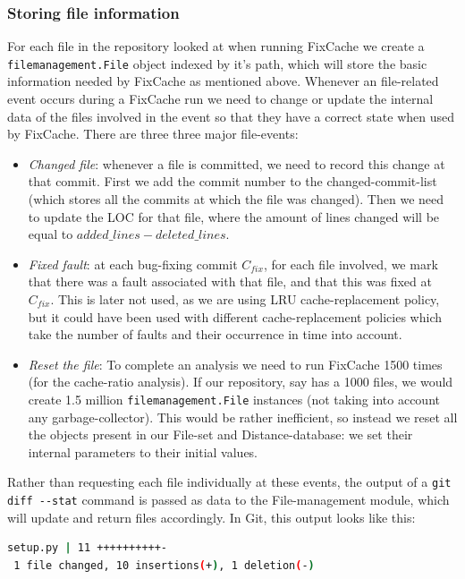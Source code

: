 \documentclass[12pt,twoside,notitlepage]{report}
\newcommand{\fxch}{FixCache}
\begin{document}
\subsubsection*{Storing file information}
For each file in the repository looked at when running \fxch{} we create a \texttt{filemanagement.File} object indexed by it's path, which will store the basic information needed by \fxch{} as mentioned above. Whenever an file-related event occurs during a \fxch{} run we need to change or update the internal data of the files involved in the event so that they have a correct state when used by \fxch{}. There are three three major file-events:
\begin{itemize}
\item \textit{Changed file}: whenever a file is committed, we need to record this change at that commit. First we add the commit number to the changed-commit-list (which stores all the commits at which the file was changed). Then we need to update the LOC for that file, where the amount of lines changed will be equal to $added\_lines - deleted\_lines$.
\item \textit{Fixed fault}: at each bug-fixing commit $C_{fix}$, for each file involved, we mark that there was a fault associated with that file, and that this was fixed at $C_{fix}$. This is later not used, as we are using LRU cache-replacement policy, but it could have been used with different cache-replacement policies which take the number of faults and their occurrence in time into account.
\item \textit{Reset the file}: To complete an analysis we need to run \fxch{} 1500 times (for the cache-ratio analysis). If our repository, say has a 1000 files, we would create 1.5 million \texttt{filemanagement.File} instances (not taking into account any garbage-collector). This would be rather inefficient, so instead we reset all the objects present in our File-set and Distance-database: we set their internal parameters to their initial values.
\end{itemize}

Rather than requesting each file individually at these events, the output of a \texttt{git diff -{}-stat} command is passed as data to the File-management module, which will update and return files accordingly. In Git, this output looks like this:
\vspace{0.2in}
\begin{lstlisting}[language=bash, tabsize=4, backgroundcolor=\color{lightgray}, keywordstyle=\color{black}, frame=single, framesep=10pt, xleftmargin=10pt, xrightmargin=10pt]
setup.py | 11 ++++++++++-
 1 file changed, 10 insertions(+), 1 deletion(-)
\end{lstlisting}
\end{document}
